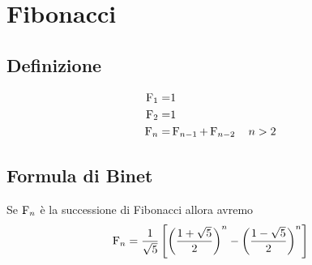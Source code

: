\chapter{Fibonacci}
\section{Definizione}
\begin{defn}
	\begin{align*}
		\operatorname{F}_{1}=&1\\
		\operatorname{F}_{2}=&1\\
		\operatorname{F}_{n}=&\operatorname{F}_{n-1}+\operatorname{F}_{n-2}\quad n>2
	\end{align*}
\end{defn}
\section{Formula di Binet}
\begin{thm}
	Se $\operatorname{F}_{n}$ è la successione di Fibonacci allora avremo
	\[\operatorname{F}_{n}=\dfrac{1}{\sqrt{5}}\left[\left(\dfrac{1+\sqrt{5}}{2}\right)^n-\left(\dfrac{1-\sqrt{5}}{2}\right)^n\right] \]
\end{thm}